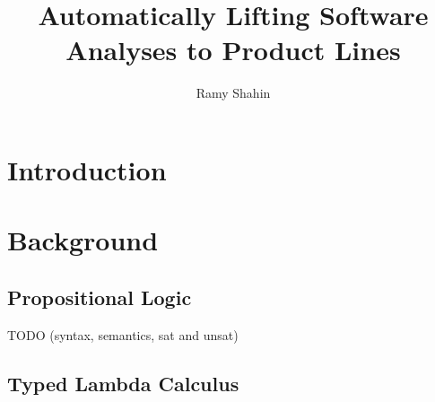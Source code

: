 \documentclass[11pt]{article} %
\title{Automatically Lifting Software Analyses to Product Lines}
\author{Ramy Shahin}
\begin{document}
\maketitle

\theoremstyle{definition}
\newtheorem{exmp}{Example}[section]

\newcommand{\tab}{\qquad}

\newcommand{\term}[1]		{\mathrm{#1}}
\newcommand{\var}[1]		{\mathrm{#1}}
\newcommand{\type}[1]		{\mathrm{#1}}
\newcommand{\kw}[1]	{\mathrm{#1}}
\newcommand{\ite}[3]		{\kw{if} \: #1 \: \kw{then} \: #2 \: \kw{else} \: #3}

\section{Introduction}



\section{Background}

\subsection{Propositional Logic}
TODO (syntax, semantics, sat and unsat)

\subsection{Typed Lambda Calculus}
\end{document}
